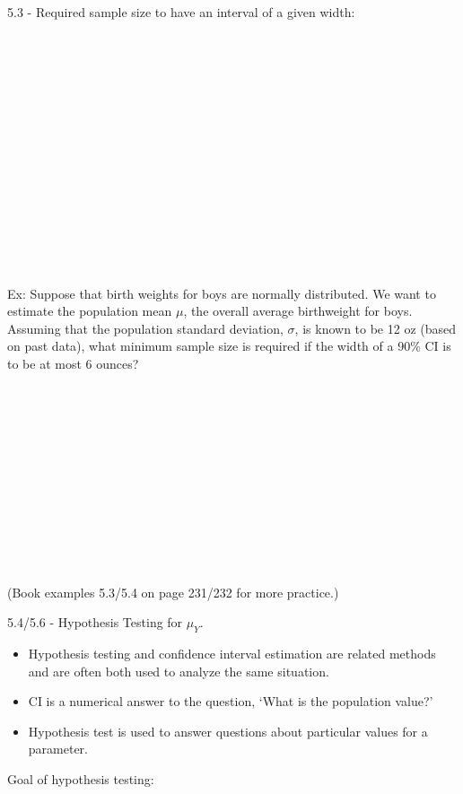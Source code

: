 \Large 5.3 - Required sample size to have an interval of a given width: \normalsize \\~\\~\\~\\~\\~\\~\\~\\~\\~\\~\\~\\~\\~\\~\\~\\

Ex: Suppose that birth weights for boys are normally distributed.  We want to estimate the population mean $\mu$, the overall average birthweight for boys.  Assuming that the population standard deviation, $\sigma$, is known to be 12 oz (based on past data), what minimum sample size is required if the width of a 90\% CI is to be at most 6 ounces?\\~\\~\\~\\~\\~\\~\\~\\~\\~\\~\\~\\~\\

(Book examples 5.3/5.4 on page 231/232 for more practice.) 

\newpage

\Large 5.4/5.6 - Hypothesis Testing for $\mu_Y$. \normalsize\\
\begin{itemize}
\item Hypothesis testing and confidence interval estimation are related methods and are often both used to analyze the same situation.
\item CI is a numerical answer to the question, `What is the population value?'
\item Hypothesis test is used to answer questions about particular values for a parameter.
\end{itemize}

Goal of hypothesis testing: \\~\\~\\~\\~\\

